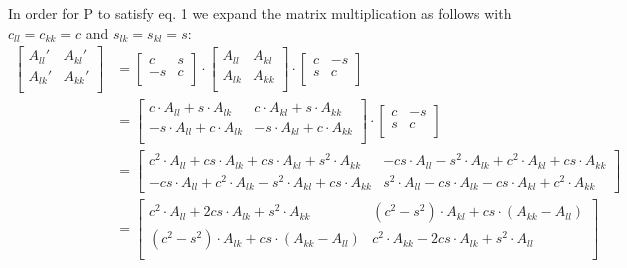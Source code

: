 \documentclass[12pt,twoside]{article}
\begin{document}
In order for P to satisfy eq. 1 we expand the matrix multiplication as follows with $c_{ll}=c_{kk}=c$ and $s_{lk}=s_{kl}=s$:\\
\begin{equation}
\begin{split}
\begin{bmatrix}
     A_{ll}' & A_{kl}' \\
    A_{lk}' & A_{kk}' \\
\end{bmatrix}
 &=
\begin{bmatrix}
     c & s \\
    -s & c \\
\end{bmatrix}
\cdot
\begin{bmatrix}
     A_{ll} & A_{kl} \\
    A_{lk} & A_{kk} \\
\end{bmatrix}
\cdot
\begin{bmatrix}
     c & -s \\
     s & c \\
\end{bmatrix}\\
&=\begin{bmatrix}
     c\cdot A_{ll} + s\cdot A_{lk} & c\cdot A_{kl} + s\cdot A_{kk} \\
     -s\cdot A_{ll} + c\cdot A_{lk} & -s\cdot A_{kl} + c\cdot A_{kk} \\
\end{bmatrix}
\cdot
\begin{bmatrix}
     c & -s \\
     s & c \\
\end{bmatrix}\\
&=\begin{bmatrix}
     c^2 \cdot A_{ll} + cs\cdot A_{lk} + cs\cdot A_{kl} + s^2\cdot A_{kk} &  -cs \cdot A_{ll} -s^2\cdot A_{lk} + c^2\cdot A_{kl} + cs\cdot A_{kk}\\
     -cs\cdot A_{ll} + c^2\cdot A_{lk} -s^2\cdot A_{kl} + cs\cdot A_{kk} & s^2\cdot A_{ll} - cs\cdot A_{lk}  -cs\cdot A_{kl} + c^2\cdot A_{kk} 
\end{bmatrix}\\
&=\begin{bmatrix}
     c^2 \cdot A_{ll} + 2cs\cdot A_{lk} + s^2\cdot A_{kk} &  (c^2-s^2)\cdot A_{kl} + cs\cdot (A_{kk}-A_{ll})\\
     (c^2-s^2)\cdot A_{lk} + cs\cdot(A_{kk}-A_{ll}) & c^2\cdot A_{kk} - 2cs\cdot A_{lk} + s^2\cdot A_{ll} \\
\end{bmatrix}
\end{split}
\end{equation}
\end{document}
